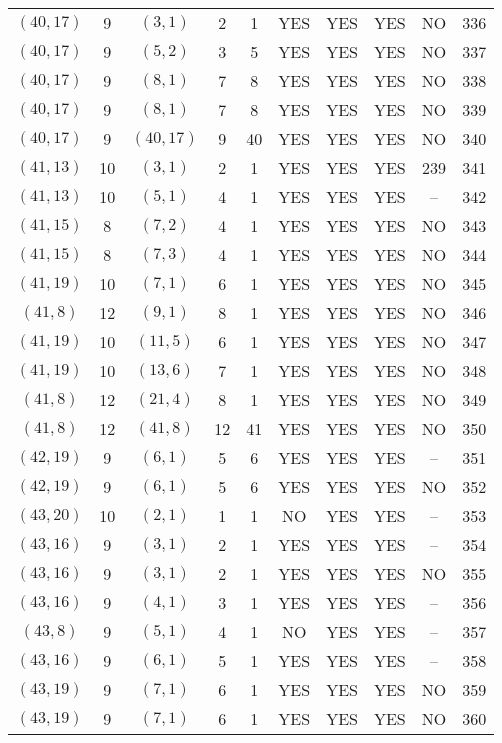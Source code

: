 \begin{longtable}{|c|c|c|c|c|c|c|c|c|c|}
$(40, 17)$ & 9 & $(3, 1)$ & 2 & 1 & YES & YES & YES & NO & 336\\
$(40, 17)$ & 9 & $(5, 2)$ & 3 & 5 & YES & YES & YES & NO & 337\\
$(40, 17)$ & 9 & $(8, 1)$ & 7 & 8 & YES & YES & YES & NO & 338\\
$(40, 17)$ & 9 & $(8, 1)$ & 7 & 8 & YES & YES & YES & NO & 339\\
$(40, 17)$ & 9 & $(40, 17)$ & 9 & 40 & YES & YES & YES & NO & 340\\
$(41, 13)$ & 10 & $(3, 1)$ & 2 & 1 & YES & YES & YES & 239 & 341\\
$(41, 13)$ & 10 & $(5, 1)$ & 4 & 1 & YES & YES & YES & -- & 342\\
$(41, 15)$ & 8 & $(7, 2)$ & 4 & 1 & YES & YES & YES & NO & 343\\
$(41, 15)$ & 8 & $(7, 3)$ & 4 & 1 & YES & YES & YES & NO & 344\\
$(41, 19)$ & 10 & $(7, 1)$ & 6 & 1 & YES & YES & YES & NO & 345\\
$(41, 8)$ & 12 & $(9, 1)$ & 8 & 1 & YES & YES & YES & NO & 346\\
$(41, 19)$ & 10 & $(11, 5)$ & 6 & 1 & YES & YES & YES & NO & 347\\
$(41, 19)$ & 10 & $(13, 6)$ & 7 & 1 & YES & YES & YES & NO & 348\\
$(41, 8)$ & 12 & $(21, 4)$ & 8 & 1 & YES & YES & YES & NO & 349\\
$(41, 8)$ & 12 & $(41, 8)$ & 12 & 41 & YES & YES & YES & NO & 350\\
$(42, 19)$ & 9 & $(6, 1)$ & 5 & 6 & YES & YES & YES & -- & 351\\
$(42, 19)$ & 9 & $(6, 1)$ & 5 & 6 & YES & YES & YES & NO & 352\\
$(43, 20)$ & 10 & $(2, 1)$ & 1 & 1 & NO & YES & YES & -- & 353\\
$(43, 16)$ & 9 & $(3, 1)$ & 2 & 1 & YES & YES & YES & -- & 354\\
$(43, 16)$ & 9 & $(3, 1)$ & 2 & 1 & YES & YES & YES & NO & 355\\
$(43, 16)$ & 9 & $(4, 1)$ & 3 & 1 & YES & YES & YES & -- & 356\\
$(43, 8)$ & 9 & $(5, 1)$ & 4 & 1 & NO & YES & YES & -- & 357\\
$(43, 16)$ & 9 & $(6, 1)$ & 5 & 1 & YES & YES & YES & -- & 358\\
$(43, 19)$ & 9 & $(7, 1)$ & 6 & 1 & YES & YES & YES & NO & 359\\
$(43, 19)$ & 9 & $(7, 1)$ & 6 & 1 & YES & YES & YES & NO & 360\\

\end{longtable}

